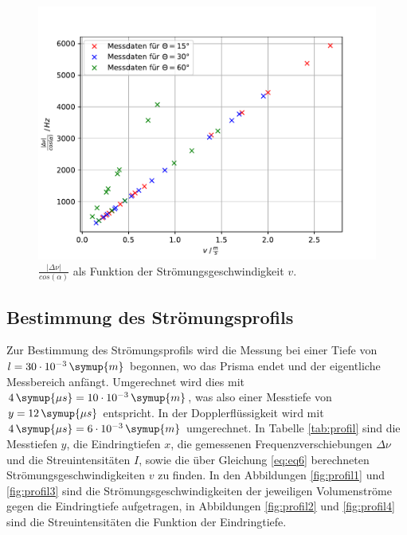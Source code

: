 \begin{figure}[h!tbp]
	\centering
	\includegraphics[width=0.8\linewidth]{graph1.pdf}
	\caption{$\frac{\lvert \Delta \nu \rvert}{cos(\alpha)}$ als Funktion der Strömungsgeschwindigkeit $v$.}
	\label{fig:stroemi}
\end{figure}






\newpage
\subsection{Bestimmung des Strömungsprofils}

Zur Bestimmung des Strömungsprofils wird die Messung bei einer Tiefe von $l = 30\cdot10^{-3}\,\symup{m}$ begonnen, wo das Prisma endet und der eigentliche Messbereich anfängt. Umgerechnet wird dies mit $4\,\symup{\mu s} = 10\cdot10^{-3}\,\symup{m}$, 
was also einer Messtiefe von $y = 12\,\symup{\mu s}$ entspricht. In der Dopplerflüssigkeit wird mit $4\,\symup{\mu s} = 6\cdot10^{-3}\,\symup{m}$ umgerechnet.
In Tabelle \ref{tab:profil} sind die Messtiefen $y$, die Eindringtiefen $x$, die gemessenen Frequenzverschiebungen $\Delta \nu$ und die Streuintensitäten $I$, sowie die über Gleichung \ref{eq:eq6} berechneten Strömungsgeschwindigkeiten $v$ zu finden.
In den Abbildungen \ref{fig:profil1} und \ref{fig:profil3} sind die Strömungsgeschwindigkeiten der jeweiligen Volumenströme gegen die Eindringtiefe aufgetragen, in Abbildungen \ref{fig:profil2} und \ref{fig:profil4} sind die Streuintensitäten die Funktion 
der Eindringtiefe.

